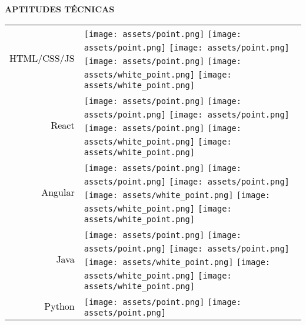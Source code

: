 \documentclass[../main.tex]{subfiles}
\begin{document}
\vspace*{0.5cm}

\textbf{\textcolor{myCV2}{APTITUDES TÉCNICAS\underline{\hspace{3.5cm}}}}
\vspace*{0.3cm}

    \begin{tabular}{r l}
    \textcolor{black}{\vspace*{0.2cm}HTML/CSS/JS} &            
            \texttt{[image: assets/point.png]}
            \texttt{[image: assets/point.png]}
            \texttt{[image: assets/point.png]}
            \texttt{[image: assets/point.png]}
            \texttt{[image: assets/white\_point.png]}
            \texttt{[image: assets/white\_point.png]}\\
    \textcolor{black}{\vspace*{0.2cm}React} &
            \texttt{[image: assets/point.png]}
            \texttt{[image: assets/point.png]}
            \texttt{[image: assets/point.png]}
            \texttt{[image: assets/point.png]}
            \texttt{[image: assets/white\_point.png]}
            \texttt{[image: assets/white\_point.png]}\\
    \textcolor{black}{\vspace*{0.2cm}Angular} &
            \texttt{[image: assets/point.png]}
            \texttt{[image: assets/point.png]}
            \texttt{[image: assets/point.png]}
            \texttt{[image: assets/white\_point.png]}
            \texttt{[image: assets/white\_point.png]}
            \texttt{[image: assets/white\_point.png]}\\
    \textcolor{black}{\vspace*{0.2cm}Java} &
            \texttt{[image: assets/point.png]}
            \texttt{[image: assets/point.png]}
            \texttt{[image: assets/point.png]}
            \texttt{[image: assets/white\_point.png]}
            \texttt{[image: assets/white\_point.png]}
            \texttt{[image: assets/white\_point.png]}\\
    \textcolor{black}{\vspace*{0.2cm}Python} &
            \texttt{[image: assets/point.png]}
            \texttt{[image: assets/point.png]}

\end{tabular}
\end{document}
